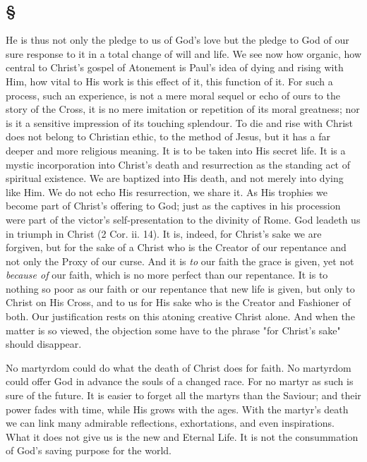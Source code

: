 \documentclass[draft]{ptfdoc}
\begin{document}
\subsection*{
\S
}

He is thus not only the pledge to us of God's 
love but the pledge to God of our sure response 
to it in a total change of will and life. We see 
now how organic, how central to Christ's gospel 
of Atonement is Paul's idea of dying and rising 
with Him, how vital to His work is this effect 
of it, this function of it. For such a process, 
such an experience, is not a mere moral sequel 
or echo of ours to the story of the Cross, it is 
no mere imitation or repetition of its moral 
greatness; nor is it a sensitive impression of 
its touching splendour. To die and rise with 
Christ does not belong to Christian ethic, to 
the method of Jesus, but it has a far deeper 
and more religious meaning. It is to be taken 
into His secret life. It is a mystic incorporation 
into Christ's death and resurrection as the 
standing act of spiritual existence. We are 
baptized into His death, and not merely into 
dying like Him. We do not echo His resurrection, 
we share it. As His trophies we become 
part of Christ's offering to God; just as the 
captives in his procession were part of the 
victor's self-presentation to the divinity of 
Rome. God leadeth us in triumph in Christ 
(2 Cor. ii. 14). It is, indeed, for Christ's sake 
we are forgiven, but for the sake of a Christ 
who is the Creator of our repentance and not 
only the Proxy of our curse. And it is \textit{to} our 
faith the grace is given, yet not \textit{because of} our 
faith, which is no more perfect than our repentance. 
It is to nothing so poor as our faith or 
our repentance that new life is given, but only 
to Christ on His Cross, and to us for His sake 
who is the Creator and Fashioner of both. Our 
justification rests on this atoning creative Christ 
alone. And when the matter is so viewed, the 
objection some have to the phrase "for Christ's 
sake" should disappear. 

No martyrdom could do what the death of 
Christ does for faith. No martyrdom could 
offer God in advance the souls of a changed 
race. For no martyr as such is sure of the 
future. It is easier to forget all the martyrs 
than the Saviour; and their power fades with 
time, while His grows with the ages. With the 
martyr's death we can link many admirable 
reflections, exhortations, and even inspirations. 
What it does not give us is the new and Eternal 
Life. It is not the consummation of God's saving 
purpose for the world. 
\end{document}

